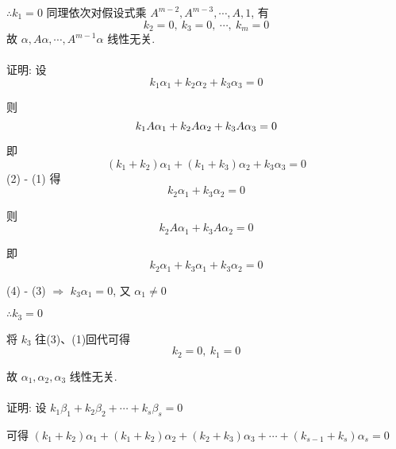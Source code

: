 		 \( \therefore k_{1} = 0 \)
		 同理依次对假设式乘 \( A^{m-2}, A^{m-3}, \cdots, A, 1 \), 有
		 \[ k_{2} = 0,\ k_{3} = 0,\ \cdots,\ k_{m} = 0 \]
		 故 \( \alpha, A\alpha, \cdots, A^{m-1}\alpha \) 线性无关.

	 \paragraph{} %
		 证明: 设 \[ k_{1}\alpha_{1} + k_{2}\alpha_{2} + k_{3}\alpha_{3} = 0 \tag{1} \]

		 则 \[ k_{1}A\alpha_{1} + k_{2}A\alpha_{2} + k_{3}A\alpha_{3} = 0 \hspace{\fill}\]

		 即 \[ (k_{1} + k_{2})\alpha_{1} + (k_{1} + k_{3})\alpha_{2} + k_{3}\alpha_{3} = 0 \tag{2}\]
		 (2) - (1) 得
		 \[
			 k_{2}\alpha_{1} + k_{3}\alpha_{2} = 0\tag{3}
		 \]


		 则 \[
			 k_{2}A\alpha_{1} + k_{3}A\alpha_{2} = 0
		 \]


		 即 \[
			 k_{2}\alpha_{1} + k_{3}\alpha_{1} + k_{3}\alpha_{2} = 0 \tag{4}
		 \]


		 (4) - (3) \( \Rightarrow \) \( k_{3}\alpha_{1} = 0 \), 又 \( \alpha_{1} \neq 0 \)

		 \(\therefore k_{3} = 0\)

		 将 \( k_{3} \) 往(3)、(1)回代可得\[ k_{2} = 0,\ k_{1} = 0 \]

		 故 \( \alpha_{1}, \alpha_{2}, \alpha_{3} \) 线性无关.

	 \paragraph{} %
		 证明: 设 \( k_{1}\beta_{1} + k_{2}\beta_{2} + \cdots + k_{s}\beta_{s} = 0 \)

		 可得 \( (k_{1} + k_{2})\alpha_{1} + (k_{1} + k_{2})\alpha_{2} + (k_{2} + k_{3})\alpha_{3} + \cdots + (k_{s-1} + k_{s})\alpha_{s} = 0 \)

